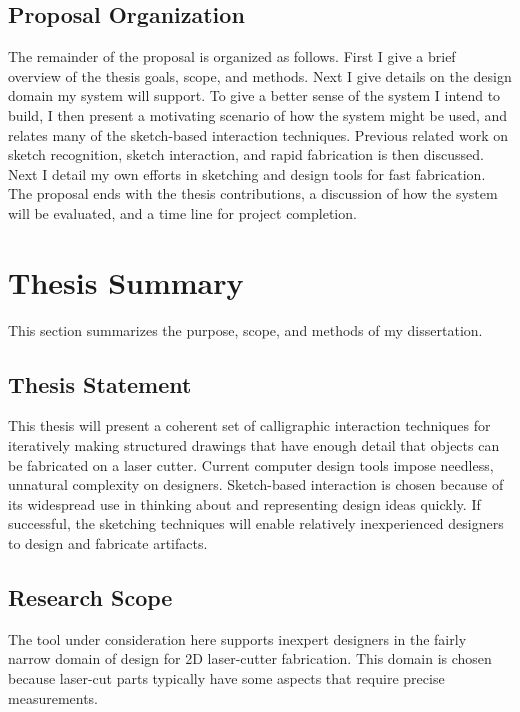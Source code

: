 \documentclass[11pt]{article}
\begin{document}
\subsection{Proposal Organization}

The remainder of the proposal is organized as follows. First I give a
brief overview of the thesis goals, scope, and methods. Next I give
details on the design domain my system will support. To give a better
sense of the system I intend to build, I then present a motivating
scenario of how the system might be used, and relates many of the
sketch-based interaction techniques. Previous related work on sketch
recognition, sketch interaction, and rapid fabrication is then
discussed. Next I detail my own efforts in sketching and design tools
for fast fabrication. The proposal ends with the thesis contributions,
a discussion of how the system will be evaluated, and a time line for
project completion.

\section{Thesis Summary}

This section summarizes the purpose, scope, and methods of my
dissertation.

\subsection{Thesis Statement}

This thesis will present a coherent set of calligraphic interaction
techniques for iteratively making structured drawings that have enough
detail that objects can be fabricated on a laser cutter. Current
computer design tools impose needless, unnatural complexity on
designers. Sketch-based interaction is chosen because of its
widespread use in thinking about and representing design ideas
quickly. If successful, the sketching techniques will enable
relatively inexperienced designers to design and fabricate artifacts.

\subsection{Research Scope}

The tool under consideration here supports inexpert designers in the
fairly narrow domain of design for 2D laser-cutter fabrication. This
domain is chosen because laser-cut parts typically have some aspects
that require precise measurements.
\end{document}
